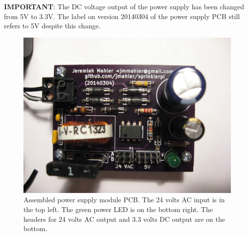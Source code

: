 \documentclass{article}
\begin{document}
\begin{framed}
\textbf{IMPORTANT}: The DC voltage output of the power supply has
been changed from 5V to 3.3V.
The label on version 20140304 of the power supply PCB still
refers to 5V despite this change.
\end{framed}

\begin{figure}[hbp!]
\begin{center}
\includegraphics[scale=0.15,angle=0]{img/power_pcb-assembled-02.jpg}
\end{center}
\caption{Assembled power supply module PCB.
The 24 volts AC input is in the top left.
The green power LED is on the bottom right.
The headers for 24 volts AC output and 3.3 volts DC
output are on the bottom.
}\label{fig:psm2}
\end{figure}
\end{document}
